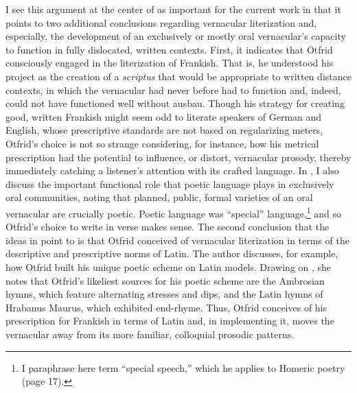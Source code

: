 I see this argument at the center of \citet{Somers2021b} as important for the current work in that it points to two additional conclusions regarding vernacular literization and, especially, the development of an exclusively or mostly oral vernacular’s capacity to function in fully dislocated, written contexts. First, it indicates that Otfrid consciously engaged in the literization of Frankish. That is, he understood his project as the creation of a \textit{scriptus} that would be appropriate to written distance contexts, in which the vernacular had never before had to function and, indeed, could not have functioned well without ausbau. Though his strategy for creating good, written Frankish might seem odd to literate speakers of German and English, whose prescriptive standards are not based on regularizing meters, Otfrid’s choice is not so strange considering, for instance, how his metrical prescription had the potential to influence, or distort, vernacular prosody, thereby immediately catching a listener’s attention with its crafted language. In , I also discuss the important functional role that poetic language plays in exclusively oral communities, noting that planned, public, formal varieties of an oral vernacular are crucially poetic. Poetic language was “special” language,\footnote{\textrm{I paraphrase here  term “special speech,” which he applies to Homeric poetry (page 17).} } and so Otfrid’s choice to write in verse makes sense. The second conclusion that the ideas in \citet[42]{Somers2021b} point to is that Otfrid conceived of vernacular literization in terms of the descriptive and prescriptive norms of Latin. The author discusses, for example, how Otfrid built his unique poetic scheme on Latin models. Drawing on \citet[208--209]{Bostock1976}, she notes that Otfrid’s likeliest sources for his poetic scheme are the Ambrosian hymns, which feature alternating stresses and dips, and the Latin hymns of Hrabanus Maurus, which exhibited end-rhyme. Thus, Otfrid conceives of his prescription for Frankish in terms of Latin and, in implementing it, moves the vernacular away from its more familiar, colloquial prosodic patterns.

